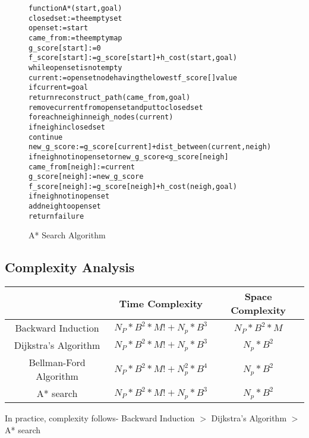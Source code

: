 \documentclass[a4paper,12pt]{article}
\begin{document}
\begin{figure}[h]
\begin{framed}
\begin{alltt}
\fontsize{8pt}{10pt}\selectfont
function A*(start,goal)
    closedset := the empty set
    openset := {start}
    came\_from := the empty map
    g\_score[start] := 0
    f\_score[start] := g\_score[start] + h\_cost(start, goal)
    while openset is not empty
      current := openset node having the lowest f\_score[] value
      if current = goal
            return reconstruct\_path(came\_from, goal)
      remove current from openset and put to closedset
      for each neigh in neigh\_nodes(current)
            if neigh in closedset
              continue
            new\_g\_score := g\_score[current] + dist\_between(current,neigh)
            if neigh not in openset or new\_g\_score < g\_score[neigh]
              came\_from[neigh] := current
              g\_score[neigh] := new\_g\_score
              f\_score[neigh] := g\_score[neigh] + h\_cost(neigh, goal)
              if neigh not in openset
                    add neigh to openset
    return failure
\end{alltt}
\end{framed}
\vspace*{-0.6cm}
\caption{A* Search Algorithm}
\vspace*{-0.4cm}
\end{figure}

\subsection{Complexity Analysis}
\begin{table}[h]
\begin{tabular}{|c|c|c|}
\hline
 & \textbf{Time Complexity} & \textbf{Space Complexity} \\
\hline
Backward Induction & $N_P*B^{2}*M! + N_p*B^3$ & $N_P*B^{2}*M$ \\
\hline
Dijkstra's Algorithm & $N_P*B^{2}*M! + N_p*B^3$ & $N_p*B^2$ \\
\hline
Bellman-Ford Algorithm & $N_P*B^{2}*M! + N_p^2*B^4$ & $N_p*B^2$ \\
\hline
A* search & $N_P*B^{2}*M! + N_p*B^3$ & $N_p*B^2$ \\
\hline
\end{tabular}
\end{table}

In practice, complexity follows-
Backward Induction $>$ Dijkstra's Algorithm $>$ A* search
\end{document}
